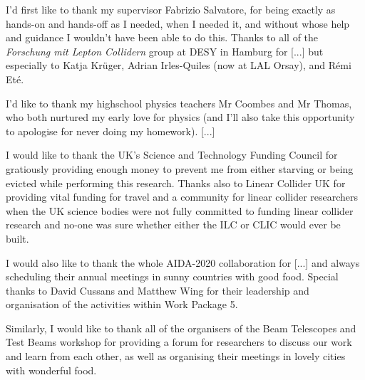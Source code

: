 
I'd first like to thank my supervisor Fabrizio Salvatore, for being exactly as hands-on and hands-off as I needed, when I needed it, and without whose help and guidance I wouldn't have been able to do this. Thanks to all of the \emph{Forschung mit Lepton Collidern} group at DESY in Hamburg for [...] but especially to Katja Kr\"{u}ger, Adrian Irles-Quiles (now at LAL Orsay), and R\'{e}mi Et\'{e}.

I'd like to thank my highschool physics teachers Mr Coombes and Mr Thomas, who both nurtured my early love for physics (and I'll also take this opportunity to apologise for never doing my homework). [...] 

I would like to thank the UK's Science and Technology Funding Council for gratiously providing enough money to prevent me from either starving or being evicted while performing this research. Thanks also to Linear Collider UK for providing vital funding for travel and a community for linear collider researchers when the UK science bodies were not fully committed to funding linear collider research and no-one was sure whether either the ILC or CLIC would ever be built.

I would also like to thank the whole AIDA-2020 collaboration for [...] and always scheduling their annual meetings in sunny countries with good food. Special thanks to David Cussans and Matthew Wing for their leadership and organisation of the activities within Work Package 5.


Similarly, I would like to thank all of the organisers of the Beam Telescopes and Test Beams workshop for providing a forum for researchers to discuss our work and learn from each other, as well as organising their meetings in lovely cities with wonderful food. 